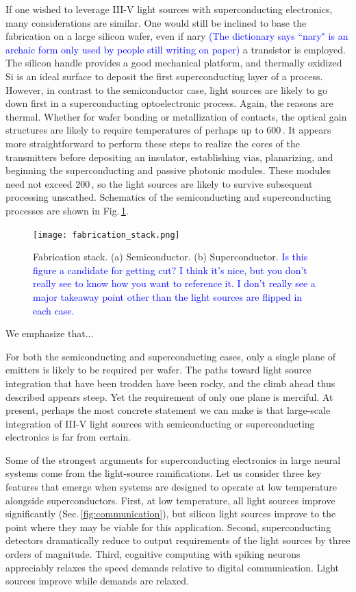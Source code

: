 \documentclass[twocolumn]{article}
\begin{document}
If one wished to leverage III-V light sources with superconducting electronics, many considerations are similar. One would still be inclined to base the fabrication on a large silicon wafer, even if nary \textcolor{blue}{(The dictionary says ``nary" is an archaic form only used by people still writing on paper)} a transistor is employed. The silicon handle provides a good mechanical platform, and thermally oxidized Si is an ideal surface to deposit the first superconducting layer of a process. However, in contrast to the semiconductor case, light sources are likely to go down first in a superconducting optoelectronic process. Again, the reasons are thermal. Whether for wafer bonding or metallization of contacts, the optical gain structures are likely to require temperatures of perhaps up to 600\,\textcelsius. It appears more straightforward to perform these steps to realize the cores of the transmitters before depositing an insulator, establishing vias, planarizing, and beginning the superconducting and passive photonic modules. These modules need not exceed 200\,\textcelsius, so the light sources are likely to survive subsequent processing unscathed. Schematics of the semiconducting and superconducting processes are shown in Fig.\,\ref{fig:fabrication_stack}.
\begin{figure}[t!]
    \centering
    \texttt{[image: fabrication\_stack.png]}
    \caption{Fabrication stack. (a) Semiconductor. (b) Superconductor. \textcolor{blue}{Is this figure a candidate for getting cut? I think it's nice, but you don't really see to know how you want to reference it. I don't really see a major takeaway point other than the light sources are flipped in each case.}}
    \label{fig:fabrication_stack}
\end{figure}
We emphasize that...

For both the semiconducting and superconducting cases, only a single plane of emitters is likely to be required per wafer. The paths toward light source integration that have been trodden have been rocky, and the climb ahead thus described appears steep. Yet the requirement of only one plane is merciful. At present, perhaps the most concrete statement we can make is that large-scale integration of III-V light sources with semiconducting or superconducting electronics is far from certain. 

Some of the strongest arguments for superconducting electronics in large neural systems come from the light-source ramifications. Let us consider three key features that emerge when systems are designed to operate at low temperature alongside superconductors. First, at low temperature, all light sources improve significantly (Sec.\,\ref{fig:communication}), but silicon light sources improve to the point where they may be viable for this application. Second, superconducting detectors dramatically reduce to output requirements of the light sources by three orders of magnitude. Third, cognitive computing with spiking neurons appreciably relaxes the speed demands relative to digital communication. Light sources improve while demands are relaxed. 
\end{document}
